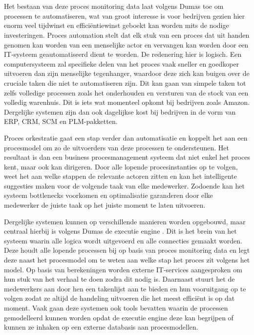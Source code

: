 \section{}%
\label{sec:proces orkestratie}
Het bestaan van deze proces monitoring data laat volgens Dumas \autocite[pp. 341-343]{Dumas2018} toe om processen te automatiseren, wat van groot interesse is voor bedrijven gezien hier enorm veel tijdwinst en efficiëntiewinst geboekt kan worden mits de nodige investeringen. Proces automation stelt dat elk stuk van een proces dat uit handen genomen kan worden van een menselijke actor en vervangen kan worden door een IT-systeem geautomatiseerd dient te worden. De redenering hier is logisch. Een computersysteem zal specifieke delen van het proces vaak sneller en goedkoper uitvoeren dan zijn menselijke tegenhanger, waardoor deze zich kan buigen over de cruciale taken die niet te automatiseren zijn. Dit kan gaan van simpele taken tot zelfs volledige processen zoals het onderhouden en versturen van de stock van een volledig warenhuis. Dit is iets wat momenteel opkomt bij bedrijven zoals Amazon.  Dergelijke systemen zijn dan ook dagelijkse kost bij bedrijven in de vorm van ERP, CRM, SCM en PLM-pakketten. \newline

Proces orkestratie \autocite[pp. 341-343]{Dumas2018} gaat een stap verder dan automatisatie en koppelt het aan een procesmodel om zo de uitvoerders van deze processen te ondersteunen. Het resultaat is dan een business procesmanagement systeem dat niet enkel het proces kent, maar ook kan dirigeren. Door alle lopende procesinstanties op te volgen, weet het aan welke stappen de relevante actoren zitten en kan het intelligente suggesties maken voor de volgende taak van elke medewerker. Zodoende kan het systeem bottlenecks voorkomen en optimalisatie garanderen door elke medewerker de juiste taak op het juiste moment te laten uitvoeren. \newline

Dergelijke systemen kunnen op verschillende manieren worden opgebouwd, maar centraal hierbij is volgens Dumas de executie engine \autocite[pp. 344-351]{Dumas2018}. Dit is het brein van het systeem waarin alle logica wordt uitgevoerd en alle connecties gemaakt worden. Deze houdt alle lopende processen bij op basis van proces monitoring data en legt deze naast het procesmodel om te weten aan welke stap het proces zit volgens het model. Op basis van berekeningen worden externe IT-services aangesproken om hun stuk van het verhaal te doen zodra dit nodig is. Daarnaast stuurt het de medewerkers aan door hen een takenlijst aan te bieden en hun vooruitgang op te volgen zodat ze altijd de handeling uitvoeren die het meest efficiënt is op dat moment. Vaak gaan deze systemen ook tools bevatten waarin de processen gemodelleerd kunnen worden opdat de executie engine deze kan begrijpen of kunnen ze inhaken op een externe databasis aan procesmodellen. \newline

